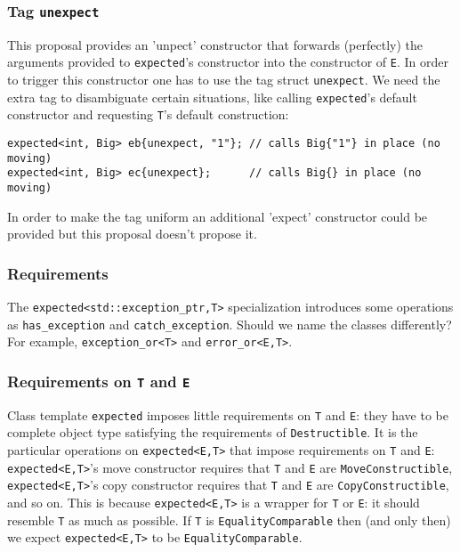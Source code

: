 \documentclass[a4paper,10pt]{article}
\newcommand{\cpp}[1]{\lstinline{#1}}
\begin{document}
\subsubsection{Tag \cpp{unexpect}}

This proposal provides an 'unpect' constructor that forwards (perfectly) the arguments provided to \cpp{expected}'s constructor into the constructor of \cpp{E}. In order to trigger this constructor one has to use the tag struct \cpp{unexpect}. We need the extra tag to disambiguate certain situations, like calling \cpp{expected}'s default constructor and requesting \cpp{T}'s default construction:

\begin{lstlisting}
expected<int, Big> eb{unexpect, "1"}; // calls Big{"1"} in place (no moving)
expected<int, Big> ec{unexpect};      // calls Big{} in place (no moving)
\end{lstlisting}

In order to make the tag uniform an additional 'expect' constructor could be provided but this proposal doesn't propose it.

\subsubsection{Requirements}

The \cpp{expected<std::exception_ptr,T>} specialization introduces some operations as \cpp{has_exception} and \cpp{catch_exception}. Should we name the classes differently? For example, \cpp{exception_or<T>} and \cpp{error_or<E,T>}.

\subsubsection{Requirements on \cpp{T} and \cpp{E}}

Class template \cpp{expected} imposes little requirements on \cpp{T} and \cpp{E}: they have to be  complete object type satisfying the requirements of \cpp{Destructible}. It is the particular operations on \cpp{expected<E,T>} that impose requirements on \cpp{T} and \cpp{E}: \cpp{expected<E,T>}'s move constructor requires that \cpp{T} and \cpp{E} are \cpp{MoveConstructible}, \cpp{expected<E,T>}'s copy constructor requires that \cpp{T} and \cpp{E} are \cpp{CopyConstructible}, and so on. This is because \cpp{expected<E,T>} is a wrapper for \cpp{T} or \cpp{E}: it should resemble \cpp{T} as much as possible. If \cpp{T} is \cpp{EqualityComparable} then (and only then) we expect \cpp{expected<E,T>} to be \cpp{EqualityComparable}. 
\end{document}
